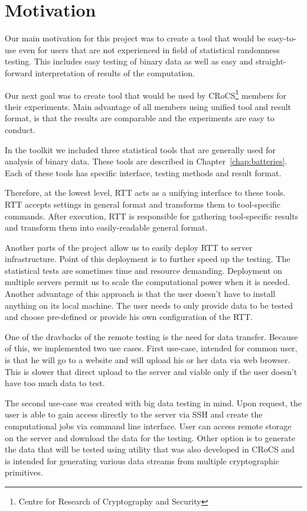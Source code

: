 \documentclass[
  digital,  	%
  color,		%
  oneside,   	%
  12pt,
  nocover,
  notable,
  nolof,
  nolot,
]{fithesis3}
\begin{document}
\section{Motivation}
Our main motivation for this project was to create a tool that would be easy-to-use even for users that are not experienced in field of statistical randomness testing. This includes easy testing of binary data as well as easy and straight-forward interpretation of results of the computation.

Our next goal was to create tool that would be used by CRoCS\footnote{Centre for Research of Cryptography and Security} members for their experiments. Main advantage of all members using unified tool and result format, is that the results are comparable and the experiments are easy to conduct.

In the toolkit we included three statistical tools that are generally used for analysis of binary data. These tools are described in Chapter~\ref{chap:batteries}. Each of these tools has specific interface, testing methods and result format. 

Therefore, at the lowest level, RTT acts as a unifying interface to these tools. RTT accepts settings in general format and transforms them to tool-specific commands. After execution, RTT is responsible for gathering tool-specific results and transform them into easily-readable general format.

Another parts of the project allow us to easily deploy RTT to server infrastructure. Point of this deployment is to further speed up the testing. The statistical tests are sometimes time and resource demanding. Deployment on multiple servers permit us to scale the computational power when it is needed. Another advantage of this approach is that the user doesn't have to install anything on its local machine. The user needs to only provide data to be tested and choose pre-defined or provide his own configuration of the RTT.

One of the dravbacks of the remote testing is the need for data transfer. Because of this, we implemented two use cases. First use-case, intended for common user, is that he will go to a website and will upload his or her data via web browser. This is slower that direct upload to the server and viable only if the user doesn't have too much data to test.

The second use-case was created with big data testing in mind. Upon request, the user is able to gain access directly to the server via SSH and create the computational jobs via command line interface. User can access remote storage on the server and download the data for the testing. Other option is to generate the data that will be tested using utility that was also developed in CRoCS and is intended for generating various data streams from multiple cryptographic primitives.
\end{document}
